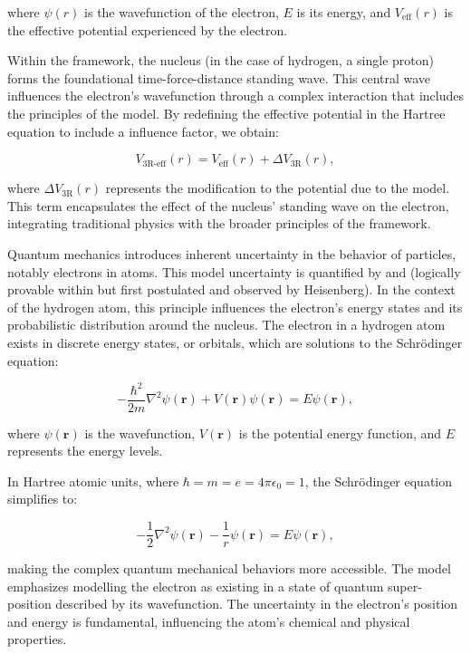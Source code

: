 \documentclass[12pt]{article}
\begin{document}
where \(\psi(r)\) is the wavefunction of the electron, \(E\) is its energy, and \(V_{\text{eff}}(r)\) is the effective potential experienced by the electron.

Within the \iR{} framework, the nucleus (in the case of hydrogen, a single proton) forms the foundational time-force-distance standing wave. This central wave influences the electron's wavefunction through a complex interaction that includes the principles of the \iR{} model. By redefining the effective potential in the Hartree equation to include a \iR{} influence factor, we obtain:

\[
    V_{\text{3R-eff}}(r) = V_{\text{eff}}(r) + \Delta V_{\text{3R}}(r),
\]

where \(\Delta V_{\text{3R}}(r)\) represents the modification to the potential due to the \iR{} model. This term encapsulates the effect of the nucleus' standing wave on the electron, integrating traditional physics with the broader principles of the \iR{} framework.

Quantum mechanics introduces inherent uncertainty in the behavior of particles, notably electrons in atoms. This model uncertainty is quantified by \qbit{} and  (logically provable within \iR{} but first postulated and observed by Heisenberg). In the context of the hydrogen atom, this principle influences the electron's energy states and its probabilistic distribution around the nucleus. The electron in a hydrogen atom exists in discrete energy states, or orbitals, which are solutions to the Schrödinger equation:

\[
    -\frac{\hbar^2}{2m}\nabla^2 \psi(\mathbf{r}) + V(\mathbf{r})\psi(\mathbf{r}) = E\psi(\mathbf{r}),
\]

where \(\psi(\mathbf{r})\) is the wavefunction, \(V(\mathbf{r})\) is the potential energy function, and \(E\) represents the energy levels.

In Hartree atomic units, where \(\hbar = m = e = 4\pi\epsilon_0 = 1\), the Schrödinger equation simplifies to:

\[
    -\frac{1}{2}\nabla^2 \psi(\mathbf{r}) - \frac{1}{r}\psi(\mathbf{r}) = E\psi(\mathbf{r}),
\]

making the complex quantum mechanical behaviors more accessible. The \iR{} model emphasizes modelling the electron as existing in a state of quantum super-position described by its wavefunction. The uncertainty in the electron's position and energy is fundamental, influencing the atom's chemical and physical properties.
\end{document}
